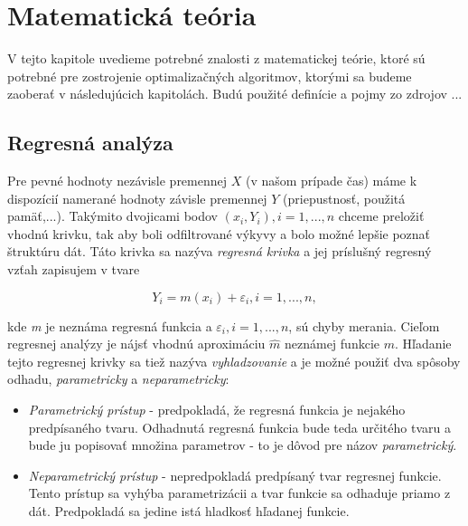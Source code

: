 \chapter{Matematická teória}

V tejto kapitole uvedieme potrebné znalosti z matematickej teórie, ktoré sú potrebné pre zostrojenie optimalizačných algoritmov, ktorými sa budeme zaoberať v následujúcich kapitolách. Budú použité definície a pojmy zo zdrojov ...

\section{Regresná analýza}
Pre pevné hodnoty nezávisle premennej $X$ (v našom prípade čas)  máme k dispozícií namerané hodnoty závisle premennej $Y$ (priepustnosť, použitá pamäť,...). Takýmito dvojicami bodov $(x_i, Y_i), i = 1,...,n$ chceme preložiť vhodnú krivku, tak aby boli odfiltrované výkyvy a bolo možné lepšie poznať štruktúru dát. Táto krivka sa nazýva \textit{regresná krivka} a jej príslušný regresný vzťah zapisujem v tvare

\begin{equation}
Y_i = m(x_i) + \varepsilon _i, i=1,...,n,
\end{equation}

kde \textit{m} je neznáma regresná funkcia a $\varepsilon _i, i = 1,...,n$, sú chyby merania. Cieľom regresnej analýzy je nájsť vhodnú aproximáciu $\hat{m}$ neznámej funkcie $m$. Hľadanie tejto regresnej krivky sa tiež nazýva \textit{vyhladzovanie} a je možné použiť dva spôsoby odhadu, \textit{parametricky} a \textit{neparametricky}:
\begin{itemize}
\item \textit{Parametrický prístup} - predpokladá, že regresná funkcia je nejakého predpísaného tvaru. Odhadnutá regresná funkcia bude teda určitého tvaru a bude ju popisovať množina parametrov - to je dôvod pre názov \textit{parametrický}.
\item \textit{Neparametrický prístup} - nepredpokladá predpísaný tvar regresnej funkcie. Tento prístup sa vyhýba parametrizácii a tvar funkcie sa odhaduje priamo z dát. Predpokladá sa jedine istá hladkosť hľadanej funkcie.
\end{itemize}

